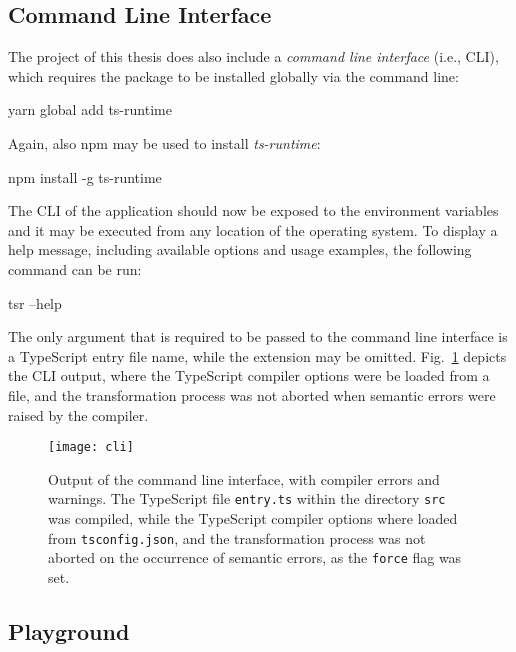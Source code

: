 \subsection{Command Line Interface}
\label{sec:usage-cli}

The project of this thesis does also include a \emph{command line interface} (i.e., CLI), which requires the package to be installed globally via the command line:
\begin{JsCode}[numbers=none]
yarn global add ts-runtime
\end{JsCode}
Again, also npm may be used to install \emph{ts-runtime}:
\begin{JsCode}[numbers=none]
npm install -g ts-runtime
\end{JsCode}
The CLI of the application should now be exposed to the environment variables and it may be executed from any location of the operating system. To display a help message, including available options and usage examples, the following command can be run:
\begin{JsCode}[numbers=none]
tsr --help
\end{JsCode}
The only argument that is required to be passed to the command line interface is a TypeScript entry file name, while the extension may be omitted. Fig.~\ref{fig:cli} depicts the CLI output, where the TypeScript compiler options were be loaded from a file, and the transformation process was not aborted when semantic errors were raised by the compiler.
\begin{figure}
\centering
\texttt{[image: cli]}
\caption{Output of the command line interface, with compiler errors and warnings. The TypeScript file \texttt{entry.ts} within the directory \texttt{src} was compiled, while the TypeScript compiler options where loaded from \texttt{tsconfig.json}, and the transformation process was not aborted on the occurrence of semantic errors, as the \texttt{force} flag was set.}
\label{fig:cli}
\end{figure}

\subsection{Playground}
\label{sec:usage-playground}

